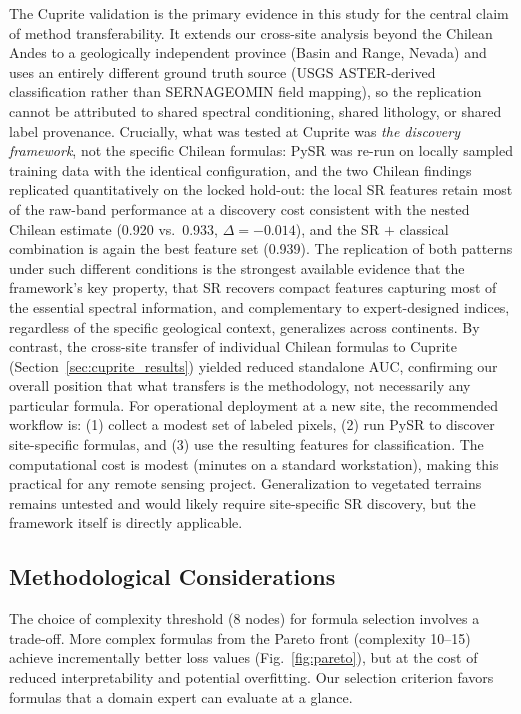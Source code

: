 \documentclass[preprint,authoryear,number]{elsarticle}
\begin{document}
The Cuprite validation is the primary evidence in this study for the central claim of method transferability. It extends our cross-site analysis beyond the Chilean Andes to a geologically independent province (Basin and Range, Nevada) and uses an entirely different ground truth source (USGS ASTER-derived classification rather than SERNAGEOMIN field mapping), so the replication cannot be attributed to shared spectral conditioning, shared lithology, or shared label provenance. Crucially, what was tested at Cuprite was \emph{the discovery framework}, not the specific Chilean formulas: PySR was re-run on locally sampled training data with the identical configuration, and the two Chilean findings replicated quantitatively on the locked hold-out: the local SR features retain most of the raw-band performance at a discovery cost consistent with the nested Chilean estimate (0.920 vs.\ 0.933, $\Delta = -0.014$), and the SR $+$ classical combination is again the best feature set (0.939). The replication of both patterns under such different conditions is the strongest available evidence that the framework's key property, that SR recovers compact features capturing most of the essential spectral information, and complementary to expert-designed indices, regardless of the specific geological context, generalizes across continents. By contrast, the cross-site transfer of individual Chilean formulas to Cuprite (Section~\ref{sec:cuprite_results}) yielded reduced standalone AUC, confirming our overall position that what transfers is the methodology, not necessarily any particular formula. For operational deployment at a new site, the recommended workflow is: (1) collect a modest set of labeled pixels, (2) run PySR to discover site-specific formulas, and (3) use the resulting features for classification. The computational cost is modest (minutes on a standard workstation), making this practical for any remote sensing project. Generalization to vegetated terrains remains untested and would likely require site-specific SR discovery, but the framework itself is directly applicable.

\subsection{Methodological Considerations}

The choice of complexity threshold (8 nodes) for formula selection involves a trade-off. More complex formulas from the Pareto front (complexity 10--15) achieve incrementally better loss values (Fig.~\ref{fig:pareto}), but at the cost of reduced interpretability and potential overfitting. Our selection criterion favors formulas that a domain expert can evaluate at a glance.
\end{document}
